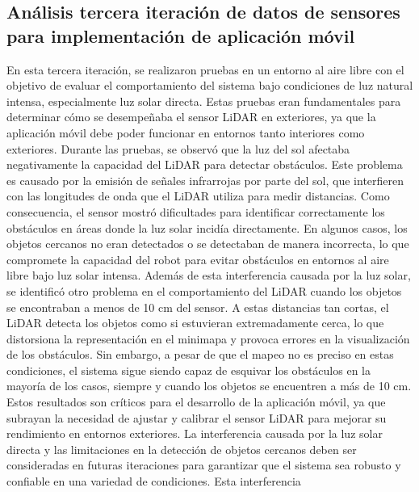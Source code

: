 \subsection{An\'alisis tercera iteraci\'on de datos de sensores para implementaci\'on de aplicaci\'on m\'ovil} %
\label{sub:An\'alisis tercera }
    En esta tercera iteraci\'on, se realizaron pruebas en un entorno al aire libre con el objetivo de evaluar el 
        comportamiento del sistema bajo condiciones de luz natural intensa, especialmente luz solar directa. 
        Estas pruebas eran fundamentales para determinar c\'omo se desempe\~naba el sensor LiDAR en exteriores, 
        ya que la aplicaci\'on m\'ovil debe poder funcionar en entornos tanto interiores como exteriores.
    \vskip 0.5cm
    Durante las pruebas, se observ\'o que la luz del sol afectaba negativamente la capacidad del LiDAR para 
        detectar obst\'aculos. Este problema es causado por la emisi\'on de se\~nales infrarrojas por parte del 
        sol, que interfieren con las longitudes de onda que el LiDAR utiliza para medir distancias. Como 
        consecuencia, el sensor mostr\'o dificultades para identificar correctamente los obst\'aculos en \'areas 
        donde la luz solar incid\'ia directamente. En algunos casos, los objetos cercanos no eran detectados 
        o se detectaban de manera incorrecta, lo que compromete la capacidad del robot para evitar obst\'aculos 
        en entornos al aire libre bajo luz solar intensa.
    \vskip 0.5cm
    Adem\'as de esta interferencia causada por la luz solar, se identific\'o otro problema en el comportamiento del 
        LiDAR cuando los objetos se encontraban a menos de 10 cm del sensor. A estas distancias tan cortas, 
        el LiDAR detecta los objetos como si estuvieran extremadamente cerca, lo que distorsiona la 
        representaci\'on en el minimapa y provoca errores en la visualizaci\'on de los obst\'aculos. Sin embargo, 
        a pesar de que el mapeo no es preciso en estas condiciones, el sistema sigue siendo capaz de esquivar 
        los obst\'aculos en la mayor\'ia de los casos, siempre y cuando los objetos se encuentren a m\'as de 10 cm.
    \vskip 0.5cm
    Estos resultados son cr\'iticos para el desarrollo de la aplicaci\'on m\'ovil, ya que subrayan la necesidad de ajustar 
        y calibrar el sensor LiDAR para mejorar su rendimiento en entornos exteriores. La interferencia causada por la 
        luz solar directa y las limitaciones en la detecci\'on de objetos cercanos deben ser consideradas en futuras 
        iteraciones para garantizar que el sistema sea robusto y confiable en una variedad de condiciones. Esta interferencia

